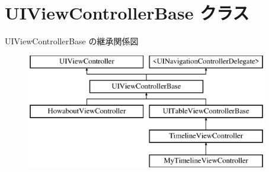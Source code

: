 \hypertarget{interface_u_i_view_controller_base}{}\section{U\+I\+View\+Controller\+Base クラス}
\label{interface_u_i_view_controller_base}
U\+I\+View\+Controller\+Base の継承関係図\begin{figure}[H]
\begin{center}
\leavevmode
\includegraphics[height=5.000000cm]{interface_u_i_view_controller_base}
\end{center}
\end{figure}
